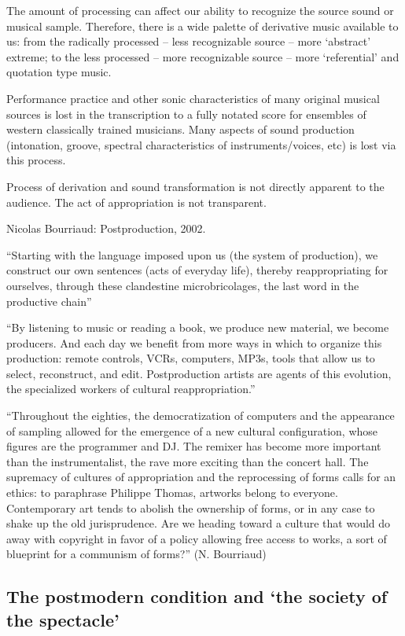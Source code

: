 The amount of processing can affect our ability to recognize the source sound or musical sample. Therefore, there is a wide palette of derivative music available to us: from the radically processed – less recognizable source – more `abstract' extreme; to the less processed – more recognizable source – more `referential'  and quotation type music.

Performance practice and other sonic characteristics of many original musical sources is lost in the transcription to a fully notated score for ensembles of western classically trained musicians. Many aspects of sound production (intonation, groove, spectral characteristics of instruments/voices, etc) is lost via this process.

Process of derivation and sound transformation is not directly apparent to the audience. The act of appropriation is not transparent.

Nicolas Bourriaud: Postproduction, 2002.

``Starting with the language imposed upon us (the system of production), we construct our own sentences (acts of everyday life), thereby reappropriating for ourselves, through these clandestine microbricolages, the last word in the productive chain''

``By listening to music or reading a book, we produce new material, we become producers. And each day we benefit from more ways in which to organize this production: remote controls, VCRs, computers, MP3s, tools that allow us to select, reconstruct, and edit. Postproduction artists are agents of this evolution, the specialized workers of cultural reappropriation.''

``Throughout the eighties, the democratization of computers and the appearance of sampling allowed for the emergence of a new cultural configuration, whose figures are the programmer and DJ. The remixer has become more important than the instrumentalist, the rave more exciting than the concert hall. The supremacy of cultures of appropriation and the reprocessing of forms calls for an ethics: to paraphrase Philippe Thomas, artworks belong to everyone. Contemporary art tends to abolish the ownership of forms, or in any case to shake up the old jurisprudence. Are we heading toward a culture that would do away with copyright in favor of a policy allowing free access to works, a sort of blueprint for a communism of forms?'' (N. Bourriaud)

\subsection{The postmodern condition and `the society of the spectacle'}

